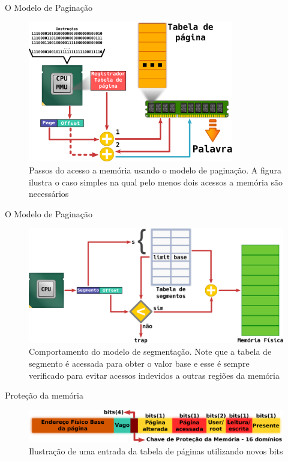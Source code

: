 \documentclass[xcolor={usenames,svgnames,dvipsnames},brazil,english,12pt,aspectratio=149]{beamer}
\begin{document}
\begin{frame}{O Modelo de Paginação}
	\begin{figure}[!h]
		\centering
		\includegraphics[width=0.8\textwidth]{paginacao_passos} 
		\caption{Passos do acesso a memória usando o modelo de paginação. A figura ilustra o caso simples na qual pelo menos dois acessos a memória são necessários}
		\label{fig:passos_paginacao}
	\end{figure}
\end{frame}

\begin{frame}{O Modelo de Paginação}
	\begin{figure}[!h]
		\centering
		\includegraphics[width=.80\textwidth]{segmentacao} 
		\caption{Comportamento do modelo de segmentação. Note que a tabela de segmento é acessada para obter o valor base e esse é sempre verificado para evitar acessos indevidos a outras regiões da memória}
		\label{fig:segmentacao} 
	\end{figure}
\end{frame}

\begin{frame}{Proteção da memória}
	\begin{figure}[!h]
		\centering
		\includegraphics[width=.80\textwidth]{pte_domain} 
		\caption{Ilustração de uma entrada da tabela de páginas utilizando novos bits}
		\label{fig:ptedominio} 
	\end{figure}
\end{frame}
\end{document}
